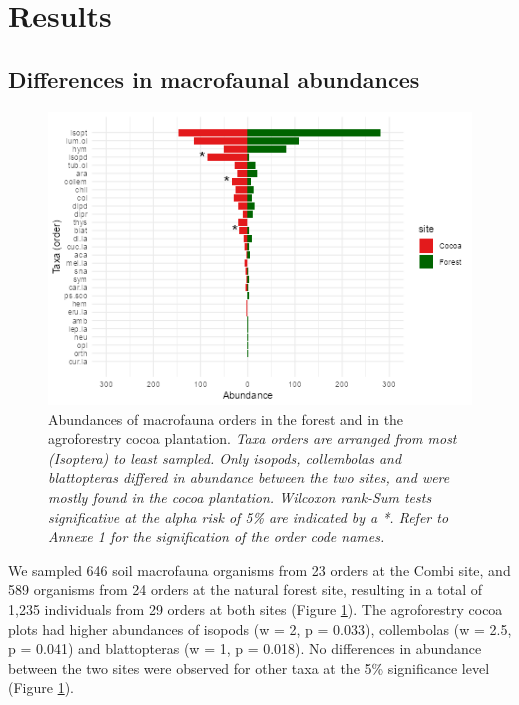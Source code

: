\documentclass[fleqn,10pt]{ArtEcoFoG} %
\begin{document}
\section{Results}\label{results}

\subsection{Differences in macrofaunal abundances}\label{differences-in-macrofaunal-abundances}

\scriptsize

\begin{figure}

{\centering \includegraphics[width=0.8\linewidth]{rapport_files/figure-latex/abundance-1} 

}

\caption{Abundances of macrofauna orders in the forest and in the agroforestry cocoa plantation. \textit{Taxa orders are arranged from most (Isoptera) to least sampled. Only isopods, collembolas and blattopteras differed in abundance between the two sites, and were mostly found in the cocoa plantation. Wilcoxon rank-Sum tests significative at the alpha risk of 5\% are indicated by a *.  Refer to Annexe 1 for the signification of the order code names.}}\label{fig:abundance}
\end{figure}

\normalsize

We sampled 646 soil macrofauna organisms from 23 orders at the Combi site, and 589 organisms from 24 orders at the natural forest site, resulting in a total of 1,235 individuals from 29 orders at both sites (Figure \ref{fig:abundance}). The agroforestry cocoa plots had higher abundances of isopods (w = 2, p = 0.033), collembolas (w = 2.5, p = 0.041) and blattopteras (w = 1, p = 0.018). No differences in abundance between the two sites were observed for other taxa at the 5\% significance level (Figure \ref{fig:abundance}).
\end{document}
